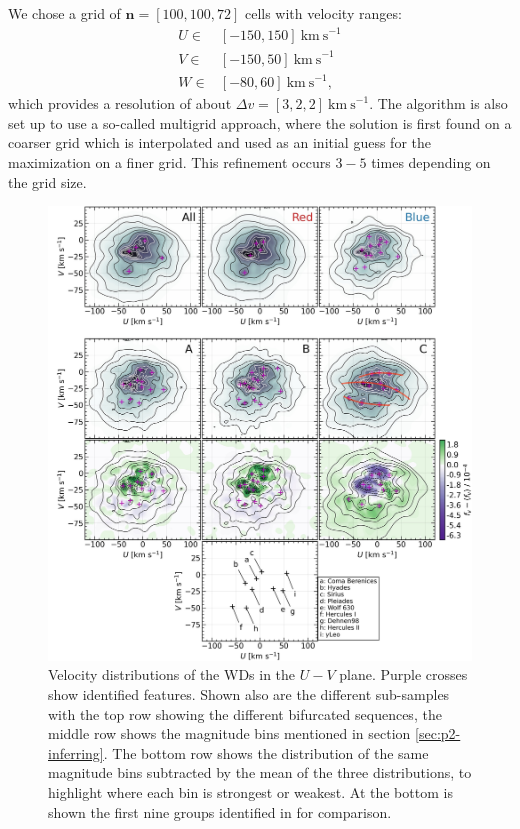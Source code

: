 We chose a grid of $\bm{n} = [100, 100, 72]$ cells with velocity ranges:
\begin{align*}
    U \in& [-150, 150]\ \mathrm{km\ s}^{-1} \\
    V \in& [-150, 50]\ \mathrm{km\ s}^{-1} \\
    W \in& [-80, 60]\ \mathrm{km\ s}^{-1},
\end{align*}
which provides a resolution of about $\Delta v = [3, 2, 2]\ \mathrm{km\ s}^{-1}$. The algorithm is also set up to use a so-called multigrid approach, where the solution is first found on a coarser grid which is interpolated and used as an initial guess for the maximization on a finer grid. This refinement occurs $3-5$ times depending on the grid size. 
\begin{figure}[t!]
    \centering
    \vspace{-40pt}
    \includegraphics[width=1\textwidth]{images/wds_fv.jpg}
    \caption{Velocity distributions of the WDs in the $U-V$ plane. Purple crosses show identified features. Shown also are the different sub-samples with the top row showing the different bifurcated sequences, the middle row shows the magnitude bins mentioned in section \ref{sec:p2-inferring}. The bottom row shows the distribution of the same magnitude bins subtracted by the mean of the three distributions, to highlight where each bin is strongest or weakest. At the bottom is shown the first nine groups identified in \cite{antoja:12} for comparison.} %
    \label{fig:wd_fv}
\end{figure}

